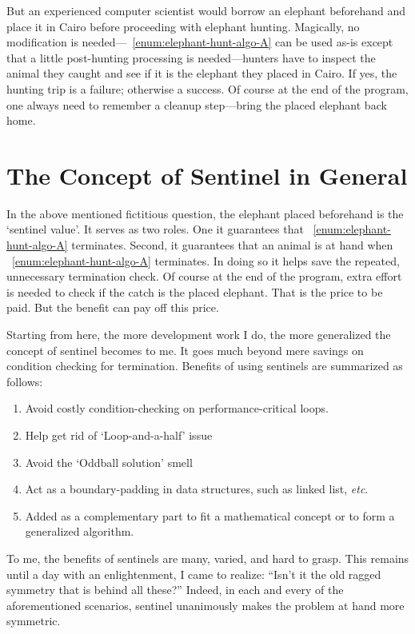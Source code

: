 \documentclass[oneside,11pt]{book}
\theoremstyle{definition}
\theoremstyle{remark}
\begin{document}
But an experienced computer scientist would borrow an elephant beforehand and place it
in Cairo before proceeding with elephant hunting.
Magically, no modification is needed---~\autoref{enum:elephant-hunt-algo-A} can be used as-is
except that a little post-hunting processing is needed---hunters have to inspect the animal they
caught and see if it is the elephant they placed in Cairo.
If yes, the hunting trip is a failure;
otherwise a success.
Of course at the end of the program, one always need to remember a cleanup step---bring
the placed elephant back home.


\section{The Concept of Sentinel in General}\label{sec:concept-of-sentinel}

In the above mentioned fictitious question, the elephant placed beforehand is the `sentinel value'.
It serves as two roles.
One it guarantees that ~\autoref{enum:elephant-hunt-algo-A} terminates.
Second, it guarantees that an animal is at hand when ~\autoref{enum:elephant-hunt-algo-A}
terminates.
In doing so it helps save the repeated, unnecessary termination check.
Of course at the end of the program, extra effort is needed to check
if the catch is the placed elephant.
That is the price to be paid.
But the benefit can pay off this price.


Starting from here, the more development work I do, the more generalized the
concept of sentinel becomes to me.
It goes much beyond mere savings on condition checking for termination.
Benefits of using sentinels are summarized as follows:
\begin{enumerate}
    \item\label{itm:sentinel:performance} Avoid costly condition-checking on performance-critical
    loops.
    \item\label{itm:sentinel:loop-and-a-half} Help get rid of `Loop-and-a-half' issue
    \item\label{itm:sentinel:oddball} Avoid the `Oddball solution' smell~\cite{Fowler1999}
    \item\label{itm:sentinel:ds} Act as a boundary-padding in data structures,
    such as linked list, \textit{etc}.
    \item Added as a complementary part to fit a mathematical concept
    or to form a generalized algorithm.
\end{enumerate}


To me, the benefits of sentinels are many, varied, and hard to grasp.
This remains until a day with an enlightenment, I came to realize: ``Isn't it the old ragged
symmetry that is behind all these?''
Indeed, in each and every of the aforementioned scenarios,
sentinel unanimously makes the problem at hand more symmetric.
\end{document}

